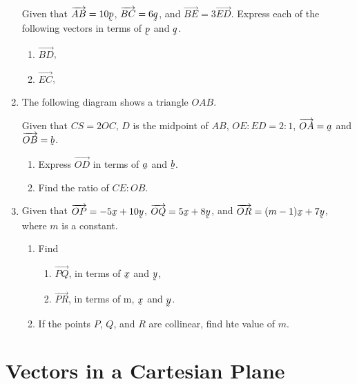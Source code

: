 \documentclass{report}
\renewcommand{\vec}[1]{\underaccent{\tilde}{#1}}
\begin{document}
\begin{multicols*}{2}
\begin{enumerate}
              Given that $\overrightarrow{AB} = 10\vec{p}$, $\overrightarrow{BC} = 6\vec{q}$,
              and $\overrightarrow{BE} = 3\overrightarrow{ED}$. Express each of the following
              vectors in terms of $\vec{p}$ and $\vec{q}$.
              \begin{enumerate}
                  \item $\overrightarrow{BD}$,
                  \item $\overrightarrow{EC}$,
              \end{enumerate}

        \item The following diagram shows a triangle $OAB$.

              Given that $CS = 2OC$, $D$ is the midpoint of $AB$, $OE:ED = 2:1$,
              $\overrightarrow{OA} = \vec{a}$ and $\overrightarrow{OB} = \vec{b}$.
              \begin{enumerate}
                  \item Express $\overrightarrow{OD}$ in terms of $\vec{a}$ and $\vec{b}$.
                  \item Find the ratio of $CE:OB$.
              \end{enumerate}

        \item Given that $\overrightarrow{OP} = -5\vec{x} + 10\vec{y}$, $\overrightarrow{OQ}
                  = 5\vec{x} + 8\vec{y}$, and $\overrightarrow{OR} = (m-1)\vec{x} + 7\vec{y}$,
              where $m$ is a constant.
              \begin{enumerate}
                  \item Find
                        \begin{enumerate}
                            \item $\overrightarrow{PQ}$, in terms of $\vec{x}$ and $\vec{y}$,
                            \item $\overrightarrow{PR}$, in terms of m, $\vec{x}$ and $\vec{y}$.
                        \end{enumerate}
                  \item If the points $P$, $Q$, and $R$ are collinear, find hte value of $m$.
              \end{enumerate}

    \end{enumerate}

    \section{Vectors in a Cartesian Plane}


\end{multicols*}
\end{document}
